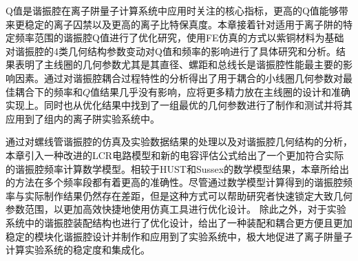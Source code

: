 Q值是谐振腔在离子阱量子计算系统中应用时关注的核心指标，更高的Q值能够带来更稳定的离子囚禁以及更高的离子比特保真度。本章接着针对适用于离子阱的特定频率范围的谐振腔Q值进行了优化研究，使用FE仿真的方式以紫铜材料为基础对谐振腔的4类几何结构参数变动对Q值和频率的影响进行了具体研究和分析。结果表明了主线圈的几何参数尤其是其直径、螺距和总线长是谐振腔性能最主要的影响因素。通过对谐振腔耦合过程特性的分析得出了用于耦合的小线圈几何参数对最佳耦合下的频率和$Q$值结果几乎没有影响，应将更多精力放在主线圈的设计和准确实现上。同时也从优化结果中找到了一组最优的几何参数进行了制作和测试并将其应用到了组内的离子阱实验系统中。

通过对螺线管谐振腔的仿真及实验数据结果的处理以及对谐振腔几何结构的分析，本章引入一种改进的LCR电路模型和新的电容评估公式给出了一个更加符合实际的谐振腔频率计算数学模型。相较于HUST和Sussex的数学模型结果，本章所给出的方法在多个频率段都有着更高的准确性。尽管通过数学模型计算得到的谐振腔频率与实际制作结果仍然存在差距，但是这种方式可以帮助研究者快速锁定大致几何参数范围，以更加高效快捷地使用仿真工具进行优化设计。
除此之外，对于实验系统中的谐振腔装配结构也进行了优化设计，给出了一种装配和耦合更方便且更加稳定的模块化谐振腔设计并制作和应用到了实验系统中，极大地促进了离子阱量子计算实验系统的稳定度和集成化。